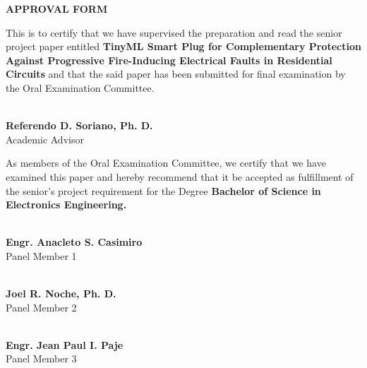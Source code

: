\thispagestyle{plain}
{}
\begin{singlespace}
\setlength{\parindent}{1.5cm}
\begin{center}
\vspace*{0.20in}
{\bfseries APPROVAL FORM}
\end{center}

\vspace{0.22in}

This is to certify that we have supervised the preparation and read the senior
project paper entitled \textbf{TinyML Smart Plug for Complementary Protection
Against Progressive Fire-Inducing Electrical Faults in Residential Circuits}
and that the said paper has been submitted for final examination by the Oral
Examination Committee.

\vspace{0.35in}

\begin{center}
\makebox[2.45in]{\hrulefill}\\[-0.05in]
{\bfseries Referendo D. Soriano, Ph. D.}\\
Academic Advisor
\end{center}

\vspace{0.32in}

As members of the Oral Examination Committee, we certify that we have examined
this paper and hereby recommend that it be accepted as fulfillment of the
senior's project requirement for the Degree \textbf{Bachelor of Science in
Electronics Engineering.}

\vspace{0.42in}

\noindent
\begin{minipage}[t]{0.46\textwidth}
\centering
\makebox[2.65in]{\hrulefill}\\[-0.05in]
{\bfseries Engr. Anacleto S. Casimiro}\\
Panel Member 1
\end{minipage}
\hfill
\begin{minipage}[t]{0.46\textwidth}
\centering
\makebox[2.65in]{\hrulefill}\\[-0.05in]
{\bfseries Joel R. Noche, Ph. D.}\\
Panel Member 2
\end{minipage}

\vspace{0.42in}

\begin{center}
\makebox[2.65in]{\hrulefill}\\[-0.05in]
{\bfseries Engr. Jean Paul I. Paje}\\
Panel Member 3
\end{center}


\end{singlespace}
